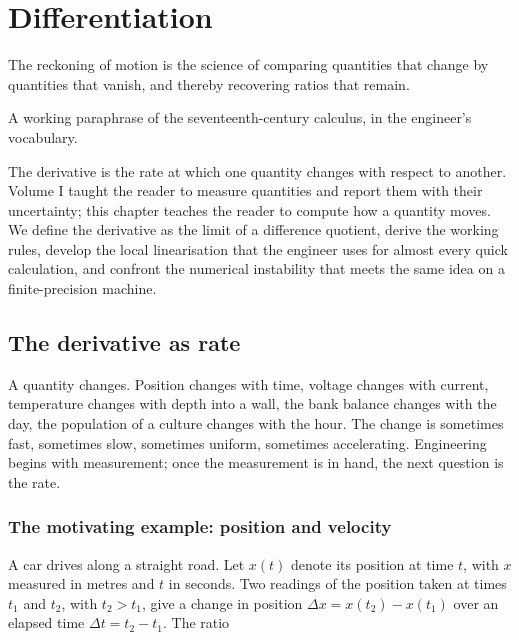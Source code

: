 \chapter{Differentiation}
\label{vol02:ch05}

\epigraph{The reckoning of motion is the science of comparing
quantities that change by quantities that vanish, and thereby
recovering ratios that remain.}{A working paraphrase of the
seventeenth-century calculus, in the engineer's vocabulary.}


\noindent
The derivative is the rate at which one quantity changes with
respect to another. Volume I taught the reader to measure quantities
and report them with their uncertainty; this chapter teaches the
reader to compute how a quantity moves. We define the derivative as
the limit of a difference quotient, derive the working rules,
develop the local linearisation that the engineer uses for almost
every quick calculation, and confront the numerical instability
that meets the same idea on a finite-precision machine.

\section{The derivative as rate}

A quantity changes. Position changes with time, voltage changes
with current, temperature changes with depth into a wall, the bank
balance changes with the day, the population of a culture changes
with the hour. The change is sometimes fast, sometimes slow,
sometimes uniform, sometimes accelerating. Engineering begins with
measurement; once the measurement is in hand, the next question is
the rate.

\subsection{The motivating example: position and velocity}

A car drives along a straight road. Let $x(t)$ denote its position
at time $t$, with $x$ measured in metres and $t$ in seconds. Two
readings of the position taken at times $t_{1}$ and $t_{2}$, with
$t_{2} > t_{1}$, give a change in position
$\Delta x = x(t_{2}) - x(t_{1})$ over an elapsed time
$\Delta t = t_{2} - t_{1}$. The ratio

